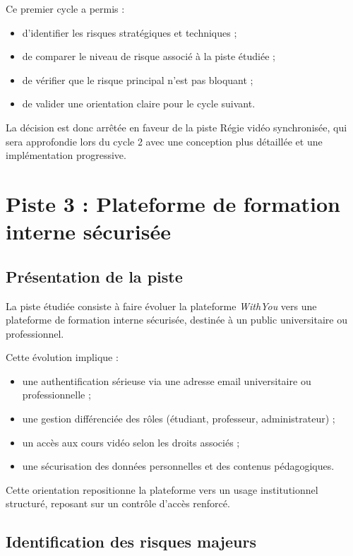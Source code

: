 \documentclass[12pt,a4paper]{report}
\begin{document}
Ce premier cycle a permis :
\begin{itemize}
  \item d’identifier les risques stratégiques et techniques ;
  \item de comparer le niveau de risque associé à la piste étudiée ;
  \item de vérifier que le risque principal n’est pas bloquant ;
  \item de valider une orientation claire pour le cycle suivant.
\end{itemize}
La décision est donc arrêtée en faveur de la piste Régie vidéo synchronisée, qui sera approfondie
lors du cycle 2 avec une conception plus détaillée et une implémentation progressive.


\newpage
\section{Piste 3 : Plateforme de formation interne sécurisée}
\label{sec:piste3}

\subsection{Présentation de la piste}

La piste étudiée consiste à faire évoluer la plateforme \textit{WithYou} vers une
plateforme de formation interne sécurisée, destinée à un public universitaire ou
professionnel.

Cette évolution implique :
\begin{itemize}
  \item une authentification sérieuse via une adresse email universitaire ou professionnelle ;
  \item une gestion différenciée des rôles (étudiant, professeur, administrateur) ;
  \item un accès aux cours vidéo selon les droits associés ;
  \item une sécurisation des données personnelles et des contenus pédagogiques.
\end{itemize}

Cette orientation repositionne la plateforme vers un usage institutionnel structuré,
reposant sur un contrôle d’accès renforcé.

\subsection{Identification des risques majeurs}
\end{document}

